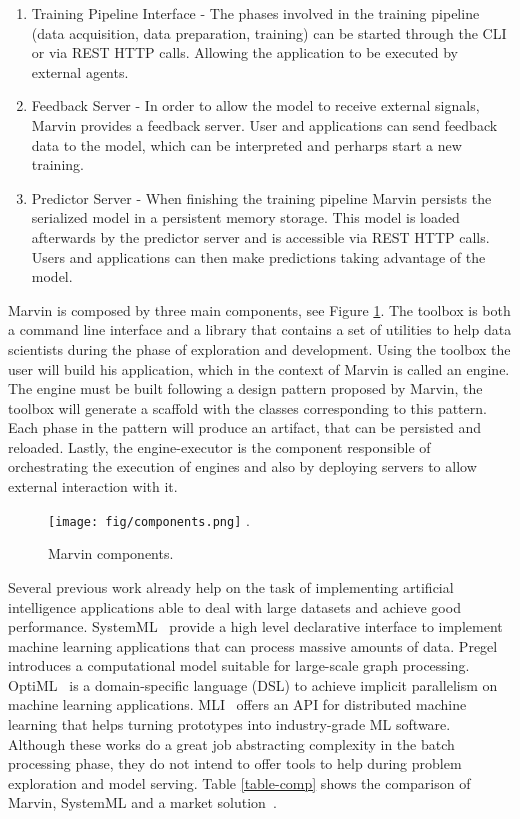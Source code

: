 \documentclass[twoside,11pt]{article}
\begin{document}
\begin{enumerate}
    \item Training Pipeline Interface - The phases involved in the training pipeline (data acquisition, data preparation, training) can be started through the CLI or via REST HTTP calls. Allowing the application to be executed by external agents.
    \item Feedback Server - In order to allow the model to receive external signals, Marvin provides a feedback server. User and applications can send feedback data to the model, which can be interpreted and perharps start a new training.
    \item Predictor Server - When finishing the training pipeline Marvin persists the serialized model in a persistent memory storage. This model is loaded afterwards by the predictor server and is accessible via REST HTTP calls. Users and applications can then make predictions taking advantage of the model.
\end{enumerate}

Marvin is composed by three main components, see Figure \ref{fig_components}. The toolbox is both a command line interface and a library that contains a set of utilities to help data scientists during the phase of exploration and development. Using the toolbox the user will build his application, which in the context of Marvin is called an engine. The engine must be built following a design pattern proposed by Marvin, the toolbox will generate a scaffold with the classes corresponding to this pattern. Each phase in the pattern will produce an artifact, that can be persisted and reloaded. Lastly, the engine-executor is the component responsible of orchestrating the execution of engines and also by deploying servers to allow external interaction with it.

\begin{figure}[h]
\centering
\texttt{[image: fig/components.png]}
\DeclareGraphicsExtensions.
\caption{Marvin components.}
\label{fig_components}
\end{figure}

Several previous work already help on the task of implementing artificial intelligence applications able to deal with large datasets and achieve good performance. SystemML~\citep{ghoting2011systemml} provide a high level declarative interface to implement machine learning applications that can process massive amounts of data. Pregel~\citep{malewicz2010pregel} introduces a computational model suitable for large-scale graph processing. OptiML~\citep{sujeeth2011optiml} is a domain-specific language (DSL) to achieve implicit parallelism on machine learning applications. MLI~\citep{sparks2013mli} offers an API for distributed machine learning that helps turning prototypes into industry-grade ML software. Although these works do a great job abstracting complexity in the batch processing phase, they do not intend to offer tools to help during problem exploration and model serving. Table \ref{table-comp} shows the comparison of Marvin, SystemML and a market solution~\citep{clouddsw}.
\end{document}
